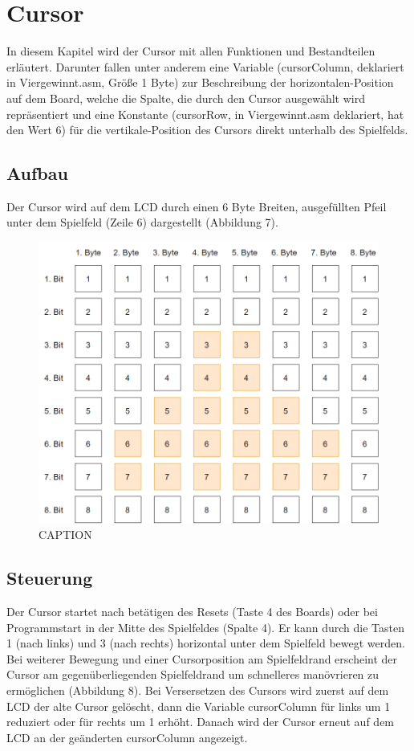 \newpage
\section{Cursor}
    In diesem Kapitel wird der Cursor mit allen Funktionen und Bestandteilen erläutert.
    Darunter fallen unter anderem eine Variable (cursorColumn, deklariert in Viergewinnt.asm, Größe 1 Byte)
    zur Beschreibung der horizontalen-Position auf dem Board, welche die Spalte, die durch den Cursor ausgewählt wird repräsentiert und eine Konstante
    (cursorRow, in Viergewinnt.asm deklariert, hat den Wert 6) für die vertikale-Position des Cursors direkt unterhalb des Spielfelds.

    \subsection{Aufbau}
        Der Cursor wird auf dem LCD durch einen 6 Byte Breiten, ausgefüllten Pfeil unter dem Spielfeld (Zeile 6) dargestellt (Abbildung 7).

        \begin{figure}[H]
            \centering
            \includegraphics[scale=0.35]{img/cursor.png}    
            \caption{CAPTION}
        \end{figure}
    
    \subsection{Steuerung}
        Der Cursor startet nach betätigen des Resets (Taste 4 des Boards) oder bei Programmstart in der Mitte des Spielfeldes (Spalte 4).
        Er kann durch die Tasten 1 (nach links) und 3 (nach rechts) horizontal unter dem Spielfeld bewegt werden.
        Bei weiterer Bewegung und einer Cursorposition am Spielfeldrand erscheint der Cursor am gegenüberliegenden Spielfeldrand um schnelleres manövrieren zu ermöglichen (Abbildung 8).
        Bei Versersetzen des Cursors wird zuerst auf dem LCD der alte Cursor gelöscht,
        dann die Variable cursorColumn für links um 1 reduziert oder für rechts um 1 erhöht.
        Danach wird der Cursor erneut auf dem LCD an der geänderten cursorColumn angezeigt.

